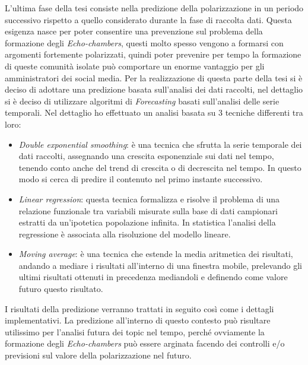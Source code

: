 L'ultima fase della tesi consiste nella predizione della polarizzazione in un periodo successivo rispetto a quello considerato durante la fase di raccolta dati. Questa esigenza nasce per poter consentire una prevenzione sul problema della formazione degli \textit{Echo-chambers}, questi molto spesso vengono a formarsi con argomenti fortemente polarizzati, quindi poter prevenire per tempo la formazione di queste comunità isolate può comportare un enorme vantaggio per gli amministratori dei social media. Per la realizzazione di questa parte della tesi si è deciso di adottare una predizione basata sull'analisi dei dati raccolti, nel dettaglio si è deciso di utilizzare algoritmi di \textit{Forecasting} basati sull'analisi delle serie temporali.\cite{Forecasting}
Nel dettaglio ho effettuato un analisi basata su 3 tecniche differenti tra loro:
\begin{itemize}
\item \textit{Double exponential smoothing}: è una tecnica che sfrutta la serie temporale dei dati raccolti, assegnando una crescita esponenziale sui dati nel tempo, tenendo conto anche del trend di crescita o di decrescita nel tempo. In questo modo si cerca di predire il contenuto nel primo instante successivo.
\item \textit{Linear regression}: questa tecnica formalizza e risolve il problema di una relazione funzionale tra variabili misurate sulla base di dati campionari estratti da un'ipotetica popolazione infinita. In statistica l'analisi della regressione è associata alla risoluzione del modello lineare. 
\item \textit{Moving average}: è una tecnica che estende la media aritmetica dei risultati, andando a mediare i risultati all'interno di una finestra mobile, prelevando gli ultimi risultati ottenuti in precedenza mediandoli e definendo come valore futuro questo risultato. 
\end{itemize}
I risultati della predizione verranno trattati in seguito così come i dettagli implementativi. La predizione all'interno di questo contesto può risultare utilissimo per l'analisi futura dei topic nel tempo, perché ovviamente la formazione degli \textit{Echo-chambers} può essere arginata facendo dei controlli e/o previsioni sul valore della polarizzazione nel futuro.
